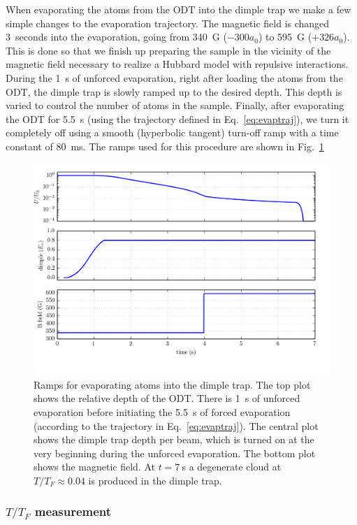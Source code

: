 When evaporating the atoms from the ODT into the dimple trap we make a few
simple changes to the evaporation trajectory.  The magnetic field is changed
3~seconds into the evaporation, going from 340~G ($-300a_{0}$) to 595~G
($+326a_{0}$).  This is done so that we finish up preparing the sample in the
vicinity of the magnetic field necessary to realize a Hubbard model with
repulsive interactions.   During the 1~s of unforced evaporation, right after
loading the atoms from the ODT, the dimple trap is slowly ramped up to the
desired depth.  This depth is varied to control the number of atoms in the
sample.  Finally, after evaporating the ODT  for 5.5~s (using the trajectory
defined in Eq.~\ref{eq:evaptraj}), we turn it completely off using a smooth
(hyperbolic tangent) turn-off ramp with a time constant of 80~ms.  The ramps
used for this procedure are shown in Fig.~\ref{fig:dimple-evap} 
\begin{figure}
    \centering
\includegraphics[width=\textwidth]{../figures/evap/dimple_traj.png}
\caption{\small Ramps for evaporating atoms into the dimple trap.  The top plot
shows the relative depth of the ODT. There is 1~s of unforced evaporation
before initiating the 5.5~s of forced evaporation (according to the trajectory
in Eq.~\ref{eq:evaptraj}). The central plot shows the dimple trap depth per
beam, which is turned on at the very beginning during the unforced evaporation.
The bottom plot shows the magnetic field.  At $t=7~$s a degenerate cloud at
$T/T_{F} \approx 0.04$ is produced in the dimple trap. }
\label{fig:dimple-evap}
\end{figure}
 
\subsubsection{$T/T_{F}$ measurement} 

